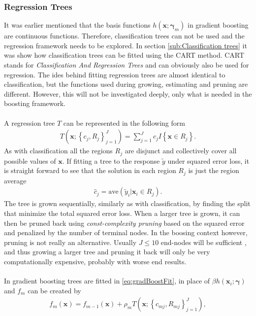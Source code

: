 \subsubsection{Regression Trees}
\label{sub:Regression Trees}
It was earlier mentioned that the basis functions $h(\mathbf{x}; \bm{\gamma}_m)$ in gradient boosting are continuous functions. Therefore, classification trees can not be used and the regression framework needs to be explored.
In section \ref{sub:Classification trees} it was show how classification trees can be fitted using the CART method. CART stands for \textit{Classification And Regression Trees} and can obviously also be used for regression. The ides behind fitting regression trees are almost identical to classification, but the functions used during growing, estimating and pruning are different. However, this will not be investigated deeply, only what is needed in the boosting framework.\\
\\
A regression tree $T$ can be represented in the following form 
\begin{align}
  T(\mathbf{x}; \left\{ c_j, R_j \right\}_{j = 1}^J)  = \sum^{J}_{j=1} c_j I\left\{ \mathbf{x} \in R_j \right\}.
\end{align}
As with classification all the regions $R_j$ are disjunct and collectively cover all possible values of $\mathbf{x}$. If fitting a tree to the response $\tilde y$ under squared error loss, it is straight forward to see that the solution in each region $R_j$ is just the region average
\begin{align}
  \hat{c}_j = \mathrm{ave}(\tilde y_i | \mathbf{x}_i \in R_j).
\end{align}
The tree is grown sequentially, similarly as with classification, by finding the split that minimize the total squared error loss. When a larger tree is grown, it can then be pruned back using \textit{const-complexity pruning} based on the squared error and penalized by the number of terminal nodes. In the boosing context however, pruning is not really an alternative. Usually $J \leq 10$ end-nodes will be sufficient \cite[p.~363]{modstat}, and thus growing a larger tree and pruning it back will only be very computationally expensive, probably with worse end results. \\
\\
In gradient boosting trees are fitted in \eqref{eq:gradBoostFit}, in place of $\beta h(\mathbf{x}_i; \bm{\gamma})$ and $f_m$ can be created by
\begin{align}
  f_m(\mathbf{x}) = f_{m-1}(\mathbf{x}) + \rho_m T(\mathbf{x}; \left\{ c_{m j}, R_{m j} \right\}_{j=1}^{J}),
\end{align}

